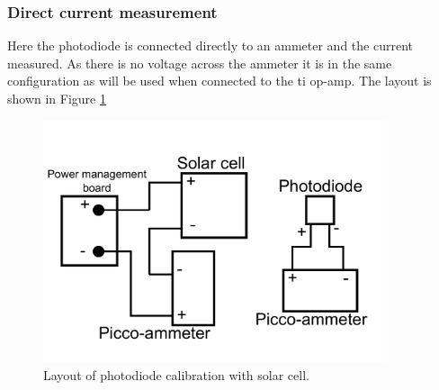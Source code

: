 \documentclass[11pt]{article} %
\begin{document}
\subsubsection{Direct current measurement}
Here the photodiode is connected directly to an ammeter and the current measured.  As there is no voltage across the ammeter it is in the same configuration as will be used when connected to the ti op-amp.  The layout is shown in Figure \ref{fig:photodiode_solar_cell_calibration_current}
\begin{figure}[htbp]
	\center
	\includegraphics[width = 0.9\textwidth]{../images/photodiode_solar_cell_calibration_current.pdf}
	\caption{Layout of photodiode calibration with solar cell.}
	\label{fig:photodiode_solar_cell_calibration_current}
\end{figure}
\end{document}
